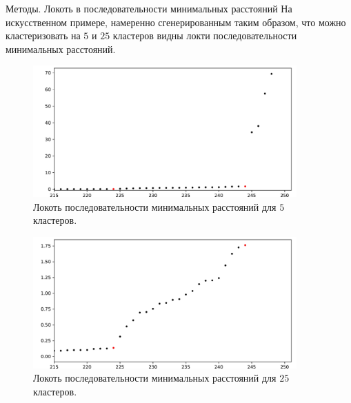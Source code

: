 \documentclass{beamer}
\begin{document}
\begin{frame}{Методы. Локоть в последовательности минимальных расстояний}
  На искусственном примере, намеренно сгенерированным таким образом, что
  можно кластеризовать на $5$ и $25$ кластеров видны локти последовательности
  минимальных расстояний.

  \begin{overprint}
    \begin{figure}
      \includegraphics[width=0.9\textwidth]{./figures/agglomerative-elbow-1.pdf}

      \caption{Локоть последовательности минимальных расстояний для $5$ кластеров.}
    \end{figure}

    \begin{figure}
      \includegraphics[width=0.9\textwidth]{./figures/agglomerative-elbow-2.pdf}

      \caption{Локоть последовательности минимальных расстояний для $25$ кластеров.}
    \end{figure}
  \end{overprint}
\end{frame}
\end{document}
